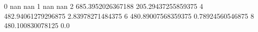 0 nan nan
1 nan nan
2 685.3952026367188 205.29437255859375
4 482.94061279296875 2.83978271484375
6 480.89007568359375 0.78924560546875
8 480.100830078125 0.0
